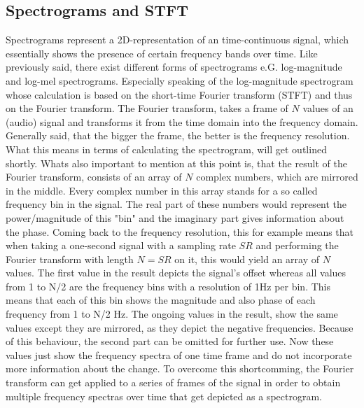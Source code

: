 \subsection{Spectrograms and STFT}
Spectrograms represent a 2D-representation of an time-continuous signal, which essentially shows the presence of certain frequency bands over time. Like previously said, there exist different forms of spectrograms e.G. log-magnitude and log-mel spectrograms. Especially speaking of the log-magnitude spectrogram whose calculation is based on the short-time Fourier transform (STFT) and thus on the Fourier transform. The Fourier transform, takes a frame of $N$ values of an (audio) signal and transforms it from the time domain into the frequency domain. Generally said, that the bigger the frame, the better is the frequency resolution. What this means in terms of calculating the spectrogram, will get outlined shortly. Whats also important to mention at this point is, that the result of the Fourier transform, consists of an array of $N$ complex numbers, which are mirrored in the middle. Every complex number in this array stands for a so called frequency bin in the signal. The real part of these numbers would represent the power/magnitude of this "bin" and the imaginary part gives information about the phase. Coming back to the frequency resolution, this for example means that when taking a one-second signal with a sampling rate $SR$ and performing the Fourier transform with length $N=SR$ on it, this would yield an array of $N$ values. The first value in the result depicts the signal's offset whereas all values from 1 to N/2 are the frequency bins with a resolution of 1Hz per bin. This means that each of this bin shows the magnitude and also phase of each frequency from 1 to N/2 Hz. The ongoing values in the result, show the same values except they are mirrored, as they depict the negative frequencies. Because of this behaviour, the second part can be omitted for further use. Now these values just show the frequency spectra of one time frame and do not incorporate more information about the change. To overcome this shortcomming, the Fourier transform can get applied to a series of frames of the signal in order to obtain multiple frequency spectras over time that get depicted as a spectrogram.\\

